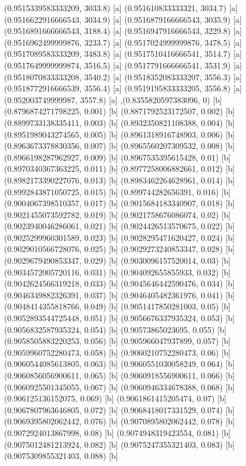 {{{(0.9515339583333209, 3033.8) [a] 
(0.951610833333321, 3034.7) [a] 
(0.9516622916666543, 3034.9) [a] 
(0.9516879166666543, 3035.9) [a] 
(0.9516891666666543, 3188.4) [a] 
(0.9516947916666543, 3229.8) [a] 
(0.9516962499999876, 3233.7) [a] 
(0.9517024999999876, 3478.5) [a] 
(0.9517089583333209, 3483.8) [a] 
(0.9517510416666541, 3514.7) [a] 
(0.9517649999999874, 3516.5) [a] 
(0.9517791666666541, 3531.9) [a] 
(0.9518070833333208, 3540.2) [a] 
(0.9518352083333207, 3556.3) [a] 
(0.9518772916666539, 3556.4) [a] 
(0.9519195833333205, 3556.8) [a] 
(0.952003749999987, 3557.8) [a] 
},{(0.8355820597383096, 0) [b] 
(0.8796874271798225, 0.001) [b] 
(0.8871792523172507, 0.002) [b] 
(0.8899733138335411, 0.003) [b] 
(0.8932350821108388, 0.004) [b] 
(0.8951989043274565, 0.005) [b] 
(0.8961318916748903, 0.006) [b] 
(0.8963673378830356, 0.007) [b] 
(0.8965560207309532, 0.008) [b] 
(0.8966198287962927, 0.009) [b] 
(0.8967535395615428, 0.01) [b] 
(0.8970340367363225, 0.011) [b] 
(0.8977258006882661, 0.012) [b] 
(0.8982173390227076, 0.013) [b] 
(0.8983462264628961, 0.014) [b] 
(0.8992843871050725, 0.015) [b] 
(0.899744282656391, 0.016) [b] 
(0.9004067398510357, 0.017) [b] 
(0.9015684183340907, 0.018) [b] 
(0.9021455073592782, 0.019) [b] 
(0.9021758676086074, 0.02) [b] 
(0.9023940046286061, 0.021) [b] 
(0.9024426513570675, 0.022) [b] 
(0.9025299960301589, 0.023) [b] 
(0.9028295471620427, 0.024) [b] 
(0.9029010566728076, 0.025) [b] 
(0.9029273240853347, 0.028) [b] 
(0.9029679490853347, 0.029) [b] 
(0.9030096157520014, 0.03) [b] 
(0.9034572005720116, 0.031) [b] 
(0.904092655855933, 0.032) [b] 
(0.9042624566319218, 0.033) [b] 
(0.9045646442590476, 0.034) [b] 
(0.9046349882326391, 0.037) [b] 
(0.9046405482361976, 0.041) [b] 
(0.9048414355818766, 0.049) [b] 
(0.9051417850281003, 0.05) [b] 
(0.9052893544725448, 0.051) [b] 
(0.9056676337935324, 0.053) [b] 
(0.9056832587935324, 0.054) [b] 
(0.90573865023695, 0.055) [b] 
(0.9058505883220253, 0.056) [b] 
(0.905966047937899, 0.057) [b] 
(0.9059960752280473, 0.058) [b] 
(0.9060210752280473, 0.06) [b] 
(0.9060544085613805, 0.063) [b] 
(0.9060551030058249, 0.064) [b] 
(0.9060856056900611, 0.065) [b] 
(0.9060918556900611, 0.066) [b] 
(0.9060925501345055, 0.067) [b] 
(0.9060946334678388, 0.068) [b] 
(0.906125136152075, 0.069) [b] 
(0.9061861415205474, 0.07) [b] 
(0.9067807963646805, 0.072) [b] 
(0.9068418017331529, 0.074) [b] 
(0.9069395802062442, 0.076) [b] 
(0.9070895802062442, 0.078) [b] 
(0.9072924013867998, 0.08) [b] 
(0.9074948319423554, 0.081) [b] 
(0.9075012481213924, 0.082) [b] 
(0.9075247355321403, 0.083) [b] 
(0.9075309855321403, 0.088) [b] 
}}}
